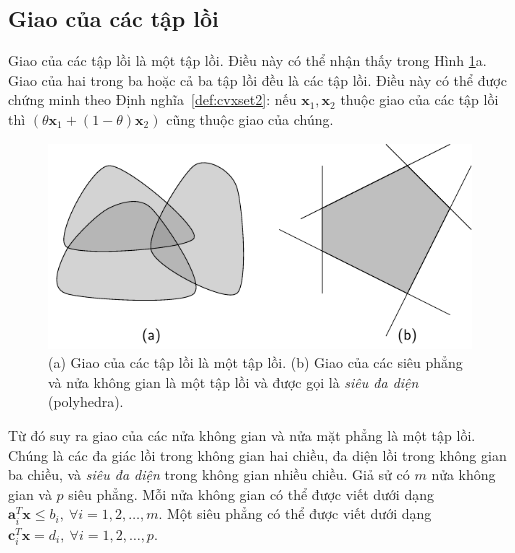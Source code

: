 

\subsection{Giao của các tập lồi}
Giao của các tập lồi là một tập lồi. Điều này có thể nhận thấy trong Hình
\ref{fig:16_intersection}a. Giao của hai trong ba hoặc cả ba tập lồi đều là các
tập lồi. Điều này có thể được chứng minh theo Định nghĩa~\ref{def:cvxset2}: nếu
$\mathbf{x}_1, \mathbf{x}_2$ thuộc giao của các tập lồi thì $(\theta\mathbf{x}_1 + (1 - \theta) \mathbf{x}_2)$ cũng thuộc giao của chúng.

\begin{figure}[t]
\centering
\includegraphics[width = .6\textwidth]{Chapters/08_ConvexOptimization/16_convexity/latex/intersection.pdf}
\caption[]{(a) Giao của các tập lồi là một tập lồi. (b) Giao của các
siêu phẳng và nửa không gian là một tập lồi và được gọi là \textit{siêu đa diện} (polyhedra).}
\label{fig:16_intersection}
\end{figure}

Từ đó suy ra giao của các nửa không gian và nửa mặt phẳng
là một tập lồi. Chúng là các đa giác lồi trong không gian hai chiều, đa
diện lồi trong không gian ba chiều, và \textit{siêu đa diện} trong không gian nhiều chiều.
Giả sử có $m$ nửa không gian và $p$ siêu phẳng. Mỗi nửa không gian có thể được viết dưới dạng $\mathbf{a}_i^T\mathbf{x} \leq
b_i, ~\forall i = 1, 2, \dots, m$. Một siêu phẳng có thể được viết
dưới dạng $\mathbf{c}_i^T\mathbf{x} = d_i, ~\forall i = 1, 2, \dots, p$.

